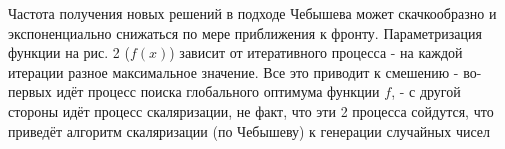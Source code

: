 Частота получения новых решений в подходе Чебышева может скачкообразно и экспоненциально снижаться по мере приближения к фронту. Параметризация функции на рис. 2 ($f(x)$) зависит от итеративного процесса - на каждой итерации разное максимальное значение. Все это приводит к смешению - во-первых идёт процесс поиска глобального оптимума функции $f$, - с другой стороны идёт процесс скаляризации, не факт, что эти 2 процесса сойдутся, что приведёт алгоритм скаляризации (по Чебышеву) к генерации случайных чисел
